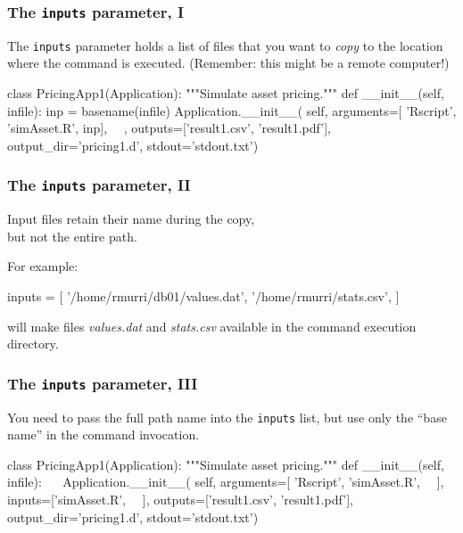 \documentclass[english,serif,mathserif,xcolor=pdftex,dvipsnames,table]{beamer}
\begin{document}
\begin{frame}[fragile]
\frametitle{The \texttt{inputs} parameter, I}

The \texttt{inputs} parameter holds a list of files that you want to
\emph{copy} to the location where the command is executed. (Remember:
this might be a remote computer!)

  \+
\begin{python}
class PricingApp1(Application):
  """Simulate asset pricing."""
  def __init__(self, infile):
    inp = basename(infile)
    Application.__init__(
      self,
      arguments=[
        'Rscript', 'simAsset.R', inp],
      ~~,
      outputs=['result1.csv', 'result1.pdf'],
      output_dir='pricing1.d',
      stdout='stdout.txt')
\end{python}
\end{frame}


\begin{frame}[fragile]
  \frametitle{The \texttt{inputs} parameter, II}

  Input files retain their name during the copy, \\ but not the entire path.

  \+
  For example:
  \begin{python}
    inputs = [
      '/home/rmurri/db01/values.dat',
      '/home/rmurri/stats.csv',
    ]
  \end{python}
  will make files \emph{values.dat} and \emph{stats.csv} available in
  the command execution directory.

\end{frame}


\begin{frame}[fragile]
  \frametitle{The \texttt{inputs} parameter, III}

  You need to pass the full path name into the
  \texttt{inputs} list, but use only the ``base name'' in the command
  invocation.

\begin{python}
class PricingApp1(Application):
  """Simulate asset pricing."""
  def __init__(self, infile):
    ~~
    Application.__init__(
      self,
      arguments=[
        'Rscript', 'simAsset.R', ~~],
      inputs=['simAsset.R', ~~],
      outputs=['result1.csv', 'result1.pdf'],
      output_dir='pricing1.d',
      stdout='stdout.txt')
\end{python}
\end{frame}
\end{document}
